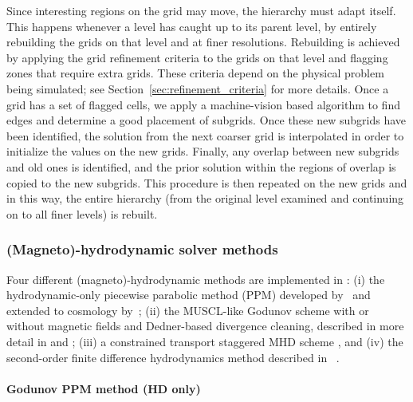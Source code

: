 Since interesting regions on the grid may move, the hierarchy must
adapt itself. This happens whenever a level has caught up to its
parent level, by entirely rebuilding the grids on that level and at
finer resolutions. Rebuilding is achieved by applying the grid
refinement criteria to the grids on that level and flagging zones that
require extra grids.  These criteria depend on the physical problem
being simulated; see Section~\ref{sec:refinement_criteria} for more
details.  Once a grid has a set of flagged cells, we apply a
machine-vision based algorithm \citep{Berger91} to find edges and
determine a good placement of subgrids.
Once these new subgrids have been identified, the solution from the
next coarser grid is interpolated in order to initialize the values on
the new grids.  Finally, any overlap between new subgrids and old ones
is identified, and the prior solution within the regions of overlap is
copied to the new subgrids. This procedure is then repeated on the new
grids and in this way, the entire hierarchy (from the original level
examined and continuing on to all finer levels) is rebuilt.

\subsubsection{(Magneto)-hydrodynamic solver methods}

Four different (magneto)-hydrodynamic methods are implemented in
\enzo: (i) the hydrodynamic-only piecewise parabolic method (PPM)
developed by~\citet{1984JCoPh..54..174C} and extended to cosmology
by~\citet{1995CoPhC..89..149B}; (ii) the MUSCL-like Godunov scheme
\citep{1977JCoPh..23..276V} with or without magnetic fields and Dedner-based
divergence cleaning, described in more detail in
\citet{WangAbelZhang08} and \citet{WangAbel09}; (iii) a constrained
transport staggered MHD scheme \citep{Collins10}, and (iv) the
second-order finite difference hydrodynamics method described in
\zeus~\citep{Stone92a,Stone92b}.

\paragraph{Godunov PPM method (HD only)}

